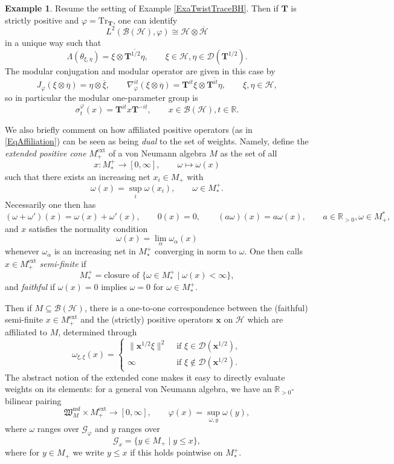 \documentclass[11pt, reqno]{amsart}
\theoremstyle{definition}
\newtheorem{example}[theorem]{Example}
\numberwithin{equation}{section}
\def\msD{\mathscr D}
\def\Hc{\mathcal H}
\def\R{\mathbb R}
\newcommand{\Hsp}{\mathcal{H}}
\newcommand{\Bc}{\mathcal{B}}
\newcommand{\Tr}{\mathrm{Tr}}
\newcommand{\ext}{\mathrm{ext}}
\newcommand{\Tb}{\mathbf{T}}
\newcommand{\nsf}{\mathrm{nsf}}
\begin{document}
\begin{example}
Resume the setting of Example \ref{ExaTwistTraceBH}. Then if $\Tb$ is strictly positive and $\varphi = \Tr_{\Tb}$, one can identify 
\[
L^2(\Bc(\Hsp),\varphi)\cong \Hsp \otimes \overline{\Hsp}
\]
in a unique way such that 
\[
\Lambda(\theta_{\xi,\eta}) = \xi\otimes \overline{\Tb^{1/2}\eta},\qquad \xi\in \Hsp, \eta\in \msD(\Tb^{1/2}). 
\]
The modular conjugation and modular operator are given in this case by 
\[
J_{\varphi}(\xi\otimes \overline{\eta}) = \eta\otimes \overline{\xi},\qquad \nabla_{\varphi}^{it}(\xi\otimes \overline{\eta}) = \Tb^{it}\xi\otimes \overline{\Tb^{it}\eta},\qquad \xi,\eta\in \Hsp,
\]
so in particular the modular one-parameter group is 
\[
\sigma_t^{\varphi}(x) = \Tb^{it}x\Tb^{-it},\qquad x\in \Bc(\Hsp),t\in \R. 
\]
\end{example}


We also briefly comment on how affiliated positive operators (as in \eqref{EqAffiliation}) can be seen as being  \emph{dual} to the set of weights. Namely, define the \emph{extended positive cone} $M_+^{\mathrm{ext}}$ of a von Neumann algebra $M$ as the set of all
\[
x\colon  M_*^+ \rightarrow [0,\infty],\qquad \omega \mapsto \omega(x)
\]
such that there exists an increasing net $x_i \in M_+$ with 
\[
\omega(x) = \sup_{i}\omega(x_i),\qquad \omega \in M_*^+.
\]
Necessarily one then has 
\[
(\omega+\omega')(x) = \omega(x)+\omega'(x),\qquad 0(x) = 0,\qquad  (a\omega)(x) = a\omega(x),\qquad a\in \R_{>0}, \omega\in M_+^*,
\]
and $x$ satisfies the normality condition 
\[
\omega(x) = \lim_{\alpha} \omega_{\alpha}(x)
\]
whenever $\omega_{\alpha}$ is an increasing net in $M_*^+$ converging in norm to $\omega$. One then calls $x\in M^{\ext}_+$ \emph{semi-finite} if 
\[
M_*^+ = \textrm{closure of }\{\omega \in M_*^+ \mid \omega(x)<\infty\},
\]
and \emph{faithful} if $\omega(x) = 0$ implies $\omega = 0$ for $\omega \in M_*^+$. 

Then if $M \subseteq \Bc(\Hc)$, there is a one-to-one correspondence between the (faithful) semi-finite $x \in M^{\ext}_+$ and the (strictly) positive operators $\mathbf{x}$ on $\Hsp$ which are affiliated to $M$, determined through 
\begin{equation}\label{EqEqualFormPos}
\omega_{\xi,\xi}(x) = \begin{cases} \|\mathbf{x}^{1/2}\xi\|^2&\text{ if } \xi \in \msD(\mathbf{x}^{1/2}),\\
\infty &\text{ if } \xi \notin\msD(\mathbf{x}^{1/2}).
\end{cases}
\end{equation}
The abstract notion of the extended cone makes it easy to directly evaluate weights on its elements: for a general von Neumann algebra, we have an $\R_{>0}$-bilinear pairing 
\[
\mathfrak{W}_M^{\nsf} \times M_+^{\ext} \rightarrow [0,\infty],\qquad \varphi(x) = \sup_{\omega,y} \omega(y),
\]
where $\omega$ ranges over $\mathcal{G}_{\varphi}$ and $y$ ranges over 
\[
\mathcal{G}_x = \{y \in M_+ \mid y\leq x\},
\]
where for $y \in M_+$ we write $y \leq x$ if this holds pointwise on $M_*^+$. 
\end{document}
